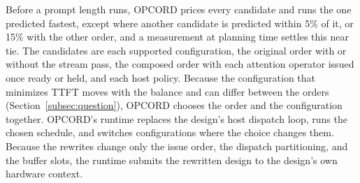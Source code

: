 Before a prompt length runs, OPCORD prices every candidate and runs the one predicted fastest, except where another candidate is predicted within 5\% of it, or 15\% with the other order, and a measurement at planning time settles this near tie.
The candidates are each supported configuration, the original order with or without the stream pass, the composed order with each attention operator issued once ready or held, and each host policy.
Because the configuration that minimizes TTFT moves with the balance and can differ between the orders (Section~\ref{subsec:question}), OPCORD chooses the order and the configuration together.
\label{subsec:impl}
OPCORD's runtime replaces the design's host dispatch loop, runs the chosen schedule, and switches configurations where the choice changes them.
Because the rewrites change only the issue order, the dispatch partitioning, and the buffer slots, the runtime submits the rewritten design to the design's own hardware context.
